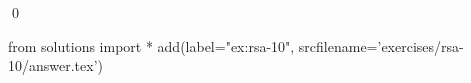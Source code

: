 
\begin{ex} 
  \label{ex:rsa-10}
  
  \qed
\end{ex} 
\begin{python0}
from solutions import *
add(label="ex:rsa-10",
    srcfilename='exercises/rsa-10/answer.tex') 
\end{python0}
